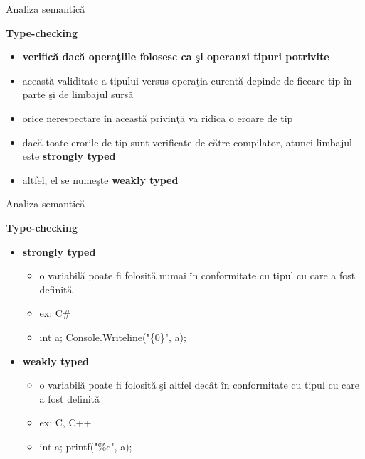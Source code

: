 \documentclass[pdf]{beamer}
\begin{document}
\begin{frame}{Analiza semantică}

\textbf{Type-checking}

\begin{itemize}
\item
\textbf{verifică dacă operaţiile folosesc ca şi operanzi tipuri potrivite}

\item
această validitate a tipului versus operaţia curentă depinde de fiecare tip în parte şi de limbajul sursă

\item
orice nerespectare în această privinţă va ridica o eroare de tip

\item
dacă toate erorile de tip sunt verificate de către compilator, atunci limbajul este \textbf{strongly typed}

\item
altfel, el se numeşte \textbf{weakly typed}

\end{itemize}
\end{frame}



\begin{frame}{Analiza semantică}

\textbf{Type-checking}

\begin{itemize}
\item
\textbf{strongly typed}
\begin{itemize}
\item
o variabilă poate fi folosită numai în conformitate cu tipul cu care a fost definită
\item
ex: C\#
\item
int a; Console.Writeline("\{0\}", a);
\end{itemize}

\item
\textbf{weakly typed}
\begin{itemize}
\item
o variabilă poate fi folosită şi altfel decât în conformitate cu tipul cu care a fost definită
\item
ex: C, C++
\item
int a; printf("\%c", a);
\end{itemize}

\end{itemize}
\end{frame}
\end{document}
